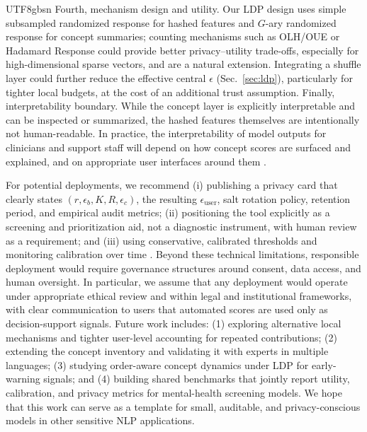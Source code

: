 \documentclass[lettersize,journal]{IEEEtran}
\begin{document}
\begin{CJK*}{UTF8}{gbsn}
Fourth, mechanism design and utility. Our LDP design uses simple subsampled randomized response for hashed features and $G$-ary randomized response for concept summaries; counting mechanisms such as OLH/OUE or Hadamard Response \cite{wang2017ldp,acharya2019hr} could provide better privacy--utility trade-offs, especially for high-dimensional sparse vectors, and are a natural extension. Integrating a shuffle layer \cite{balle2019shuffle,erlingsson2019shuffle,bittau2017prochlo} could further reduce the effective central $\epsilon$ (Sec.~\ref{sec:ldp}), particularly for tighter local budgets, at the cost of an additional trust assumption.
Finally, interpretability boundary. While the concept layer is explicitly interpretable and can be inspected or summarized, the hashed features themselves are intentionally not human-readable. In practice, the interpretability of model outputs for clinicians and support staff will depend on how concept scores are surfaced and explained, and on appropriate user interfaces around them \cite{koh2020concept}.

For potential deployments, we recommend (i) publishing a privacy card that clearly states $(r,\epsilon_b,K,R,\epsilon_c)$, the resulting $\epsilon_{\text{user}}$, salt rotation policy, retention period, and empirical audit metrics; (ii) positioning the tool explicitly as a screening and prioritization aid, not a diagnostic instrument, with human review as a requirement; and (iii) using conservative, calibrated thresholds and monitoring calibration over time \cite{guo2017calibration}. Beyond these technical limitations, responsible deployment would require governance structures around consent, data access, and human oversight. In particular, we assume that any deployment would operate under appropriate ethical review and within legal and institutional frameworks, with clear communication to users that automated scores are used only as decision-support signals. Future work includes: (1) exploring alternative local mechanisms and tighter user-level accounting for repeated contributions; (2) extending the concept inventory and validating it with experts in multiple languages; (3) studying order-aware concept dynamics under LDP for early-warning signals; and (4) building shared benchmarks that jointly report utility, calibration, and privacy metrics for mental-health screening models. We hope that this work can serve as a template for small, auditable, and privacy-conscious models in other sensitive NLP applications.



\end{CJK*}
\end{document}
